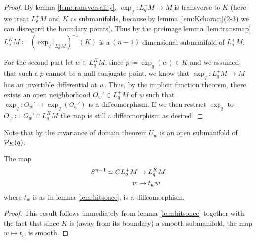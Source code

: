 \begin{proof}
    By lemma \ref{lem:transversality}, $\exp_q:L^+_qM\to M$ is transverse to $K$ (here we treat $L^+_qM$ and $K$ as submanifolds, because by lemma \ref{lem:Kcharact}(2-3) we can disregard the boundary points). Thus by the preimage lemma \ref{lem:transmap} $ L^K_qM \coloneqq  (\exp_q\rvert_{L^+_qM})^{-1}(K)$ is a $(n-1)$-dimensional submanifold of $L^+_qM$.

    For the second part let $w\in L^K_qM$; since $p\coloneqq \exp_q(w)\in K$ and we assumed that such a $p$ cannot be a null conjugate point, we know that $\exp_q:L^+_qM\to M$ has an invertible differential at $w$. Thus, by the implicit function theorem, there exists an open neighborhood $O_w'\subset L^+_qM$ of $w$ such that $\exp_q:O_w'\to \exp_q(O_w')$ is a diffeomorphism. If we then restrict $\exp_q$ to $O_w\coloneqq O_w' \cap L^K_qM$ the map is still a diffeomorphism as desired.
\end{proof}
Note that by the invariance of domain theorem $U_w$ is an open submanifold of ${\mathcal{P}}_K(q)$.

\begin{corollary}\label{cor:lksn}
    The map 
    \begin{align*}
        {S^{n-1}} \simeq CL^+_qM &\to L^K_qM\\
        w &\mapsto t_ww
    \end{align*}
    where $t_w$ is as in lemma \ref{lem:hitsonce}, is a diffeomorphism.
\end{corollary}
\begin{proof}
    This result follows immediately from lemma \ref{lem:hitsonce} together with the fact that since $K$ is (away from its boundary) a smooth submanifold, the map $w\mapsto t_w$ is smooth.
\end{proof}

